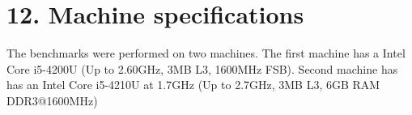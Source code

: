 \section*{12. Machine specifications}
The benchmarks were performed on two machines. The first machine has a Intel Core i5-4200U (Up to 2.60GHz, 3MB L3, 1600MHz FSB). Second machine has has an Intel Core i5-4210U at 1.7GHz (Up to 2.7GHz, 3MB L3, 6GB RAM DDR3@1600MHz)